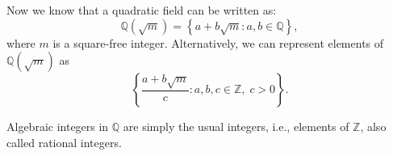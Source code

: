 \documentclass{article}
\begin{document}
\vspace{0.5em}

Now we know that a quadratic field can be written as:
\[
\mathbb{Q}(\sqrt{m}) = \left\{ a + b\sqrt{m} : a, b \in \mathbb{Q} \right\},
\]
where \( m \) is a square-free integer. Alternatively, we can represent elements of \( \mathbb{Q}(\sqrt{m}) \) as
\[
\left\{ \frac{a + b\sqrt{m}}{c} : a, b, c \in \mathbb{Z}, \; c > 0 \right\}.
\]

\noindent
Algebraic integers in \(\mathbb{Q}\) are simply the usual integers, i.e., elements of \(\mathbb{Z}\), also called rational integers.\\\\

\end{document}

